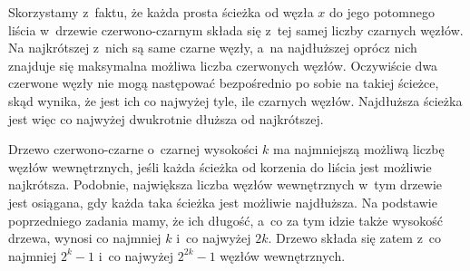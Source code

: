 \exercise %
Skorzystamy z~faktu, że każda prosta ścieżka od węzła $x$ do jego potomnego liścia w~drzewie czerwono-czarnym składa się z~tej samej liczby czarnych węzłów.
Na najkrótszej z~nich są same czarne węzły, a~na najdłuższej oprócz nich znajduje się maksymalna możliwa liczba czerwonych węzłów.
Oczywiście dwa czerwone węzły nie mogą następować bezpośrednio po sobie na takiej ścieżce, skąd wynika, że jest ich co najwyżej tyle, ile czarnych węzłów.
Najdłuższa ścieżka jest więc co najwyżej dwukrotnie dłuższa od najkrótszej.

\exercise %
Drzewo czerwono-czarne o~czarnej wysokości $k$ ma najmniejszą możliwą liczbę węzłów wewnętrznych, jeśli każda ścieżka od korzenia do liścia jest możliwie najkrótsza.
Podobnie, największa liczba węzłów wewnętrznych w~tym drzewie jest osiągana, gdy każda taka ścieżka jest możliwie najdłuższa.
Na podstawie poprzedniego zadania mamy, że ich długość, a~co za tym idzie także wysokość drzewa, wynosi co najmniej $k$ i~co najwyżej $2k$.
Drzewo składa się zatem z~co najmniej $2^k-1$ i~co najwyżej $2^{2k}-1$ węzłów wewnętrznych.

\exercise %
